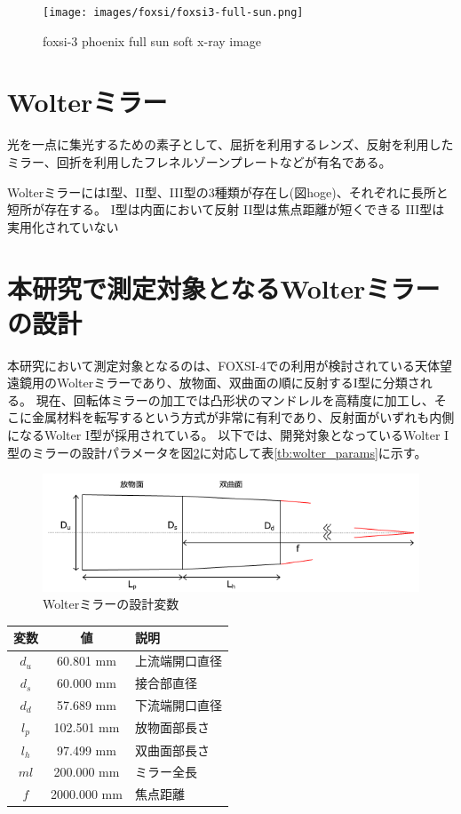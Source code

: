 \documentclass[dvipdfmx,autodetect-engine]{jreport}
\begin{document}
\begin{figure}[h!]
\centering
\texttt{[image: images/foxsi/foxsi3-full-sun.png]}
\caption{foxsi-3 phoenix full sun soft x-ray image}
\label{fig:foxsi-fullsun-image}
\end{figure}

\section{Wolterミラー}

光を一点に集光するための素子として、屈折を利用するレンズ、反射を利用したミラー、回折を利用したフレネルゾーンプレートなどが有名である。

WolterミラーにはI型、II型、III型の3種類が存在し(図hoge)、それぞれに長所と短所が存在する。
I型は内面において反射
II型は焦点距離が短くできる
III型は実用化されていない

\section{本研究で測定対象となるWolterミラーの設計}
本研究において測定対象となるのは、FOXSI-4での利用が検討されている天体望遠鏡用のWolterミラーであり、放物面、双曲面の順に反射するI型に分類される。
現在、回転体ミラーの加工では凸形状のマンドレルを高精度に加工し、そこに金属材料を転写するという方式が非常に有利であり、反射面がいずれも内側になるWolter I型が採用されている。
以下では、開発対象となっているWolter I型のミラーの設計パラメータを図\ref{fig:wolter_params}に対応して表\ref{tb:wolter_params}に示す。

\begin{figure}[h!]
\centering
\includegraphics[scale=0.55]{images/mirror_experiment/mirror_params.png}
\caption{Wolterミラーの設計変数}
\label{fig:wolter_params}
\end{figure}

\begin{center}
  \begin{tabular}{|c|c|l|} \hline
    変数 & 値 & 説明 \\ \hline
    $d_u$ & 60.801 mm & 上流端開口直径 \\
    $d_s$ & 60.000 mm & 接合部直径 \\
    $d_d$ & 57.689 mm & 下流端開口直径 \\
    $l_p$ & 102.501 mm & 放物面部長さ \\
    $l_h$ & 97.499 mm & 双曲面部長さ \\
    $ml$ & 200.000 mm & ミラー全長 \\
    $f$ & 2000.000 mm & 焦点距離 \\ \hline
  \end{tabular}
  \label{tb:wolter_params}
  \caption{Wolterミラー各設計変数の値}
\end{center}
\end{document}
